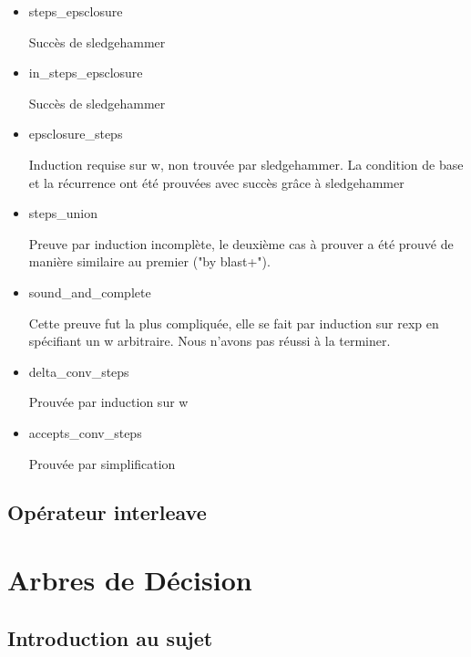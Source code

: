 \documentclass{article}
\begin{document}
\begin{itemize}


\item steps\_epsclosure

  Succès de sledgehammer

\item in\_steps\_epsclosure

  Succès de sledgehammer

\item epsclosure\_steps

  Induction requise sur w, non trouvée par sledgehammer. La condition de base et la récurrence ont été prouvées avec succès grâce à sledgehammer

\item steps\_union

  Preuve par induction incomplète, le deuxième cas à prouver a été prouvé de manière similaire au premier ("by blast+").

\item sound\_and\_complete

  Cette preuve fut la plus compliquée, elle se fait par induction sur rexp en spécifiant un w arbitraire. Nous n'avons pas réussi à la terminer.

\item delta\_conv\_steps

  Prouvée par induction sur w

\item accepts\_conv\_steps

  Prouvée par simplification

\end{itemize}

\subsection{Opérateur interleave}


\section{Arbres de Décision}

\subsection{Introduction au sujet}
\end{document}

